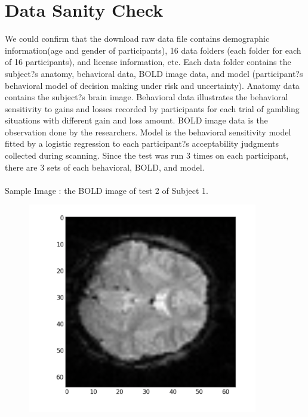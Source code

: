 \documentclass{article}
\begin{document}
\section{Data Sanity Check}
\noindent
We could confirm that the download raw data file contains demographic information(age and gender of participants), 16 data folders (each folder for each of 16 participants), and license information, etc. Each data folder contains the subject?s anatomy, behavioral data, BOLD image data, and model (participant?s behavioral model of decision making under risk and uncertainty). Anatomy data contains the subject?s brain image. Behavioral data illustrates the behavioral sensitivity to gains and losses recorded by participants for each trial of gambling situations with different gain and loss amount. BOLD image data is the observation done by the researchers. Model is the behavioral sensitivity model fitted by a logistic regression to each participant?s acceptability judgments collected during scanning. Since the test was run 3 times on each participant, there are 3 sets of each behavioral, BOLD, and model. \\\\
\noindent
Sample Image : the BOLD image of test 2 of Subject 1. 
\begin{figure}[h]
\centering
\includegraphics[width=0.3\columnwidth]{sampleimage}

\end{figure}
\end{document}
